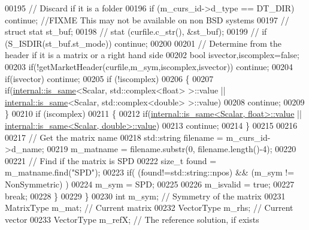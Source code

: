 \begin{DoxyCode}
00195         \textcolor{comment}{// Discard if it is a folder}
00196         \textcolor{keywordflow}{if} (m\_curs\_id->d\_type == DT\_DIR) \textcolor{keywordflow}{continue}; \textcolor{comment}{//FIXME This may not be available on non BSD systems}
00197 \textcolor{comment}{//         struct stat st\_buf; }
00198 \textcolor{comment}{//         stat (curfile.c\_str(), &st\_buf);}
00199 \textcolor{comment}{//         if (S\_ISDIR(st\_buf.st\_mode)) continue;}
00200         
00201         \textcolor{comment}{// Determine from the header if it is a matrix or a right hand side }
00202         \textcolor{keywordtype}{bool} isvector,iscomplex=\textcolor{keyword}{false};
00203         \textcolor{keywordflow}{if}(!getMarketHeader(curfile,m\_sym,iscomplex,isvector)) \textcolor{keywordflow}{continue};
00204         \textcolor{keywordflow}{if}(isvector) \textcolor{keywordflow}{continue};
00205         \textcolor{keywordflow}{if} (!iscomplex)
00206         \{
00207           \textcolor{keywordflow}{if}(\hyperlink{struct_eigen_1_1internal_1_1is__same}{internal::is\_same}<Scalar, std::complex<float> >::value || 
      \hyperlink{struct_eigen_1_1internal_1_1is__same}{internal::is\_same}<Scalar, std::complex<double> >::value)
00208             \textcolor{keywordflow}{continue}; 
00209         \}
00210         \textcolor{keywordflow}{if} (iscomplex)
00211         \{
00212           \textcolor{keywordflow}{if}(\hyperlink{struct_eigen_1_1internal_1_1is__same}{internal::is\_same<Scalar, float>::value} || 
      \hyperlink{struct_eigen_1_1internal_1_1is__same}{internal::is\_same<Scalar, double>::value})
00213             \textcolor{keywordflow}{continue}; 
00214         \}
00215         
00216         
00217         \textcolor{comment}{// Get the matrix name}
00218         std::string filename = m\_curs\_id->d\_name;
00219         m\_matname = filename.substr(0, filename.length()-4); 
00220         
00221         \textcolor{comment}{// Find if the matrix is SPD }
00222         \textcolor{keywordtype}{size\_t} found = m\_matname.find(\textcolor{stringliteral}{"SPD"});
00223         \textcolor{keywordflow}{if}( (found!=std::string::npos) && (m\_sym != NonSymmetric) )
00224           m\_sym = SPD;
00225        
00226         m\_isvalid = \textcolor{keyword}{true};
00227         \textcolor{keywordflow}{break}; 
00228       \}
00229     \}
00230     \textcolor{keywordtype}{int} m\_sym; \textcolor{comment}{// Symmetry of the matrix}
00231     MatrixType m\_mat; \textcolor{comment}{// Current matrix  }
00232     VectorType m\_rhs;  \textcolor{comment}{// Current vector}
00233     VectorType m\_refX; \textcolor{comment}{// The reference solution, if exists}

\end{DoxyCode}
